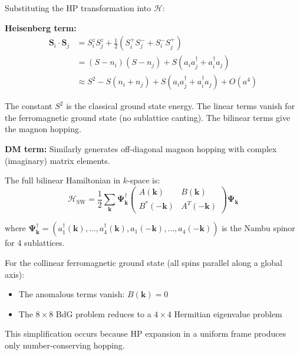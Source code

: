 \documentclass[11pt,letterpaper]{article}
\begin{document}
\begin{derivation}[title={LSWT Hamiltonian Construction}]
Substituting the HP transformation into $\mathcal{H}$:

\textbf{Heisenberg term:}
\begin{align}
\bm{S}_i \cdot \bm{S}_j &= S_i^z S_j^z + \frac{1}{2}(S_i^+ S_j^- + S_i^- S_j^+) \\
&= (S - n_i)(S - n_j) + S(a_i a_j^\dagger + a_i^\dagger a_j) \\
&\approx S^2 - S(n_i + n_j) + S(a_i a_j^\dagger + a_i^\dagger a_j) + O(a^4)
\end{align}

The constant $S^2$ is the classical ground state energy. The linear terms vanish for the ferromagnetic ground state (no sublattice canting). The bilinear terms give the magnon hopping.

\textbf{DM term:} Similarly generates off-diagonal magnon hopping with complex (imaginary) matrix elements.

The full bilinear Hamiltonian in $k$-space is:
\begin{equation}
\mathcal{H}_{\text{SW}} = \frac{1}{2} \sum_{\bm{k}} \bm{\Psi}_{\bm{k}}^\dagger 
\begin{pmatrix}
A(\bm{k}) & B(\bm{k}) \\
B^*(-\bm{k}) & A^T(-\bm{k})
\end{pmatrix}
\bm{\Psi}_{\bm{k}}
\end{equation}

where $\bm{\Psi}_{\bm{k}}^\dagger = (a_1^\dagger(\bm{k}), \ldots, a_4^\dagger(\bm{k}), a_1(-\bm{k}), \ldots, a_4(-\bm{k}))$ is the Nambu spinor for 4 sublattices.
\end{derivation}

\begin{keyresult}[title={Simplification for Collinear Ferromagnet}]
For the collinear ferromagnetic ground state (all spins parallel along a global axis):
\begin{itemize}
    \item The anomalous terms vanish: $B(\bm{k}) = 0$
    \item The $8 \times 8$ BdG problem reduces to a $4 \times 4$ Hermitian eigenvalue problem
\end{itemize}

This simplification occurs because HP expansion in a uniform frame produces only number-conserving hopping.
\end{keyresult}

\end{document}
